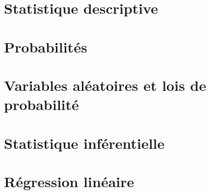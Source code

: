 




\section{Statistique descriptive}


\newpage

\section{Probabilit\'es}


\newpage

\section{Variables al\'eatoires et lois de probabilit\'e}


\newpage

\section{Statistique inf\'erentielle}


\newpage

\section{R\'egression lin\'eaire}


\newpage

\corrChapitre

%
%
%




